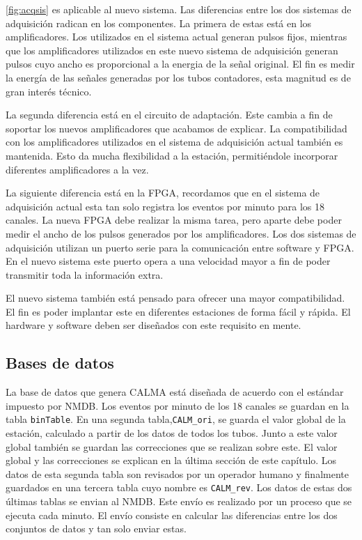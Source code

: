 		\ref{fig:acqsis} es aplicable al nuevo sistema. Las diferencias entre los dos sistemas de adquisición radican en los componentes. La
		primera de estas está en los amplificadores. Los utilizados en el sistema actual generan pulsos fijos, mientras que los amplificadores
		utilizados en este nuevo sistema de adquisición generan pulsos cuyo ancho es proporcional a la energia de la señal original. El fin es
		medir la energía de las señales generadas por los tubos contadores, esta magnitud es de gran interés técnico.
		\par
		La segunda diferencia está en el circuito de adaptación. Este cambia a fin de soportar los nuevos amplificadores que acabamos de
		explicar. La compatibilidad con los amplificadores utilizados en el sistema de adquisición actual también es mantenida. Esto da mucha
		flexibilidad a la estación, permitiéndole incorporar diferentes amplificadores a la vez.
		\par
		La siguiente diferencia está en la FPGA, recordamos que en el sistema de adquisición actual esta tan solo registra los eventos por
		minuto para los 18 canales. La nueva FPGA debe realizar la misma tarea, pero aparte debe poder medir el ancho de los pulsos generados
		por los amplificadores. Los dos sistemas de adquisición utilizan un puerto serie para la comunicación entre software y FPGA. En
		el nuevo sistema este puerto opera a una velocidad mayor a fin de poder transmitir toda la información extra.
		\par
		El nuevo sistema también está pensado para ofrecer una mayor compatibilidad. El fin es poder implantar este en diferentes estaciones
		de forma fácil y rápida. El hardware y software deben ser diseñados con este requisito en mente.
	\subsection{Bases de datos}
		La base de datos que genera CALMA está diseñada de acuerdo con el estándar impuesto por NMDB. Los eventos por minuto de los 18 canales
		se guardan en la tabla \texttt{binTable}. En una segunda tabla,\texttt{CALM\_ori}, se guarda el valor global de la estación, calculado
		a partir de los datos de todos los tubos. Junto a este valor global también se guardan las correcciones que se realizan sobre este. El
		valor global y las correcciones se explican en la última sección de este capítulo. Los datos de esta segunda tabla son revisados
		por un operador humano y finalmente guardados en una tercera tabla cuyo nombre es \texttt{CALM\_rev}. Los datos de estas dos últimas
		tablas se envian al NMDB. Este envío es realizado por un proceso que se ejecuta cada minuto. El envío consiste en calcular las
		diferencias entre los dos conjuntos de datos y tan solo enviar estas.

